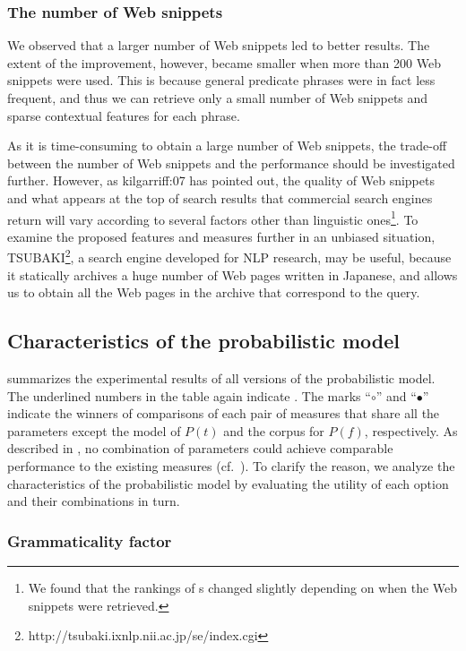 \documentclass[english]{jnlp_1.4}
\newcommand{\newcite}{}
\begin{document}
\subsubsection{The number of Web snippets}

We observed that a larger number of Web snippets led to better
results.  The extent of the improvement, however, became smaller when
more than 200 Web snippets were used.  This is because general
predicate phrases were in fact less frequent, and thus we can retrieve
only a small number of Web snippets and sparse contextual features for
each phrase.

As it is time-consuming to obtain a large number of Web snippets, the
trade-off between the number of Web snippets and the performance
should be investigated further.  However, as \newcite{kilgarriff:07}
has pointed out, the quality of Web snippets and what appears at the
top of search results that commercial search engines return will vary
according to several factors other than linguistic ones\footnote{We
  found that the rankings of {\pc}s changed slightly depending on when
  the Web snippets were retrieved.}.
To examine the proposed features and measures further in an unbiased
situation,
    TSUBAKI\footnote{http://tsubaki.ixnlp.nii.ac.jp/se/index.cgi}, a
search engine developed for NLP research, may be useful, because it
statically archives a huge number of Web pages written in Japanese,
and allows us to obtain all the Web pages in the archive that
correspond to the query.

\subsection{Characteristics of the probabilistic model}
\label{ssec:ev-gen-prob}

 summarizes the experimental results of all versions of
the probabilistic model.
The underlined numbers in the table again indicate {\compfeat}.
The marks ``$\circ$'' and ``$\bullet$'' indicate the winners of
comparisons of each pair of measures that share all the parameters
except the model of $P(t)$ and the corpus for $P(f)$, respectively.
As described in , no combination of parameters
could achieve comparable performance to the existing measures
(cf.~).  To clarify the reason, we analyze the
characteristics of the probabilistic model by evaluating the utility
of each option and their combinations in turn.


\subsubsection{Grammaticality factor}
\label{sssec:eval-gram}
\end{document}
